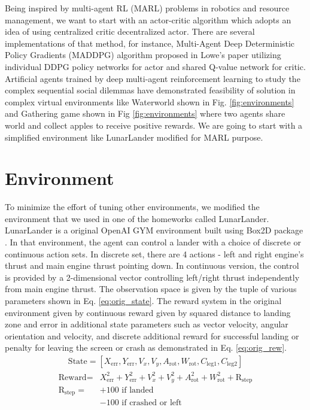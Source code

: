 \documentclass[12pt, letter]{article}
\begin{document}
Being inspired by multi-agent RL (MARL) problems\cite{Buşoniu2008} in robotics and resource management, we want to start with an actor-critic algorithm which adopts an idea of using centralized critic decentralized actor. There are several implementations of that method, for instance, Multi-Agent Deep Deterministic Policy Gradients (MADDPG) algorithm proposed in Lowe's paper \cite{lowe2017} utilizing individual DDPG policy networks for actor and shared Q-value network for critic. Artificial agents trained by deep multi-agent reinforcement learning to study the complex sequential social dilemmas have demonstrated feasibility of solution in complex virtual environments like Waterworld \cite{pytorch} shown in Fig. \ref{fig:environments} and Gathering game shown in Fig \ref{fig:environments} where two agents share world and collect apples to receive positive rewards\cite{deepmind}. We are going to start with a simplified environment like LunarLander modified for MARL purpose.
		
\section{Environment}
To minimize the effort of tuning other environments, we modified the environment that we used in one of the homeworks called LunarLander. LunarLander is a original OpenAI GYM environment built using Box2D package \cite{1606.01540}. In that environment, the agent can control a lander with a choice of discrete or continuous action sets. In discrete set, there are 4 actions - left and right engine's thrust and main engine thrust pointing down. In continuous version, the control is provided by a 2-dimensional vector controlling left/right thrust independently from main engine thrust. The observation space is given by the tuple of various parameters shown in Eq. \ref{eq:orig_state}.
The reward system in the original environment given by continuous reward given by squared distance to landing zone and error in additional state parameters such as vector velocity, angular orientation and velocity, and discrete additional reward for successful landing or penalty for leaving the screen or crash as demonstrated in Eq. \ref{eq:orig_rew}.
\begin{align}
\text{State} = [X_\text{err},Y_\text{err}, V_{x}, V_{y}, A_\text{rot},W_\text{rot},C_\text{leg1},C_\text{leg2}]
\label{eq:orig_state}
\end{align}
\begin{align}
\text{Reward} = &X^2_\text{err} + Y^2_\text{err} + V^2_{x} + V^2_{y} + A^2_\text{rot} + W^2_\text{rot} + \text{R}_\text{step}
\label{eq:orig_rew}\\
\text{R}_\text{step} = &+100\text{ if landed}\\
&-100\text{ if crashed or left}
\end{align}
\end{document}
